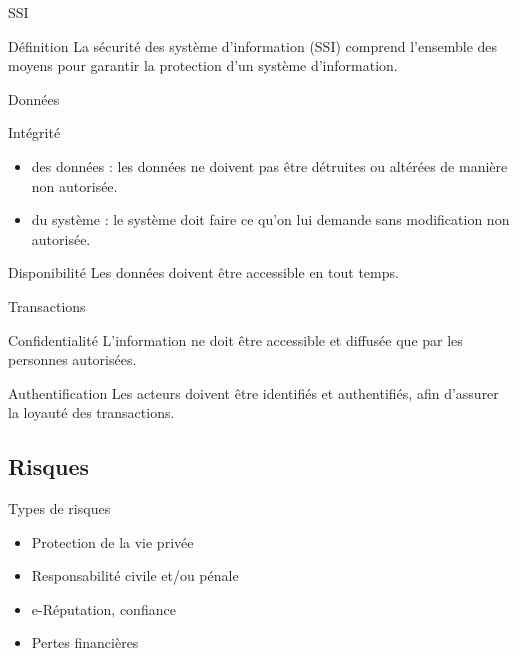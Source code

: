 \documentclass[12pt]{beamer}
\begin{document}
		\begin{frame}{SSI}
			\begin{exampleblock}{Définition}
				La \alert{sécurité des système d'information (SSI)} comprend l'ensemble des moyens pour garantir la protection d'un système d'information.
			\end{exampleblock}
		\end{frame}
		
		\begin{frame}{Données}

			\begin{exampleblock}{Intégrité}
				\begin{itemize}
					\item des données : les données ne doivent pas être détruites ou altérées de manière non autorisée.
					\item du système : le système doit faire ce qu'on lui demande sans modification non autorisée.
				\end{itemize}
			\end{exampleblock}
			\begin{exampleblock}{Disponibilité}
				Les données doivent être accessible en tout temps.
			\end{exampleblock}
		\end{frame}
		
		\begin{frame}{Transactions}
			\onslide<1->\begin{exampleblock}{Confidentialité}
				L'information ne doit être accessible et diffusée que par les personnes autorisées.
			\end{exampleblock}
			\begin{exampleblock}{Authentification}
				Les acteurs doivent être identifiés et authentifiés, afin d'assurer la loyauté des transactions.
			\end{exampleblock}
		\end{frame}
	
	\subsection{Risques}
	
		\begin{frame}{Types de risques}
			\begin{itemize}
				\item Protection de la vie privée
				\item Responsabilité civile et/ou pénale
				\item e-Réputation, confiance
				\item Pertes financières
			\end{itemize}
		\end{frame}
\end{document}
